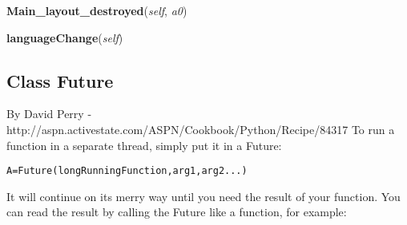    \label{Epigrass:cpanel:MainPanel:Main_layout_destroyed}

    \vspace{0.5ex}

    \begin{boxedminipage}{\textwidth}

    \raggedright \textbf{Main\_layout\_destroyed}(\textit{self}, \textit{a0})

    \end{boxedminipage}

    \label{Epigrass:cpanel:MainPanel:languageChange}

    \vspace{0.5ex}

    \begin{boxedminipage}{\textwidth}

    \raggedright \textbf{languageChange}(\textit{self})

    \end{boxedminipage}



\subsection{Class Future}

    \label{epigrass:Future}
By David Perry - 
http://aspn.activestate.com/ASPN/Cookbook/Python/Recipe/84317 To run a 
function in a separate thread, simply put it in a Future:

\begin{alltt}
\pysrcprompt{{\textgreater}{\textgreater}{\textgreater} }A=Future(longRunningFunction, arg1, arg2 ...)\end{alltt}
It will continue on its merry way until you need the result of your 
function. You can read the result by calling the Future like a function, 
for example:

